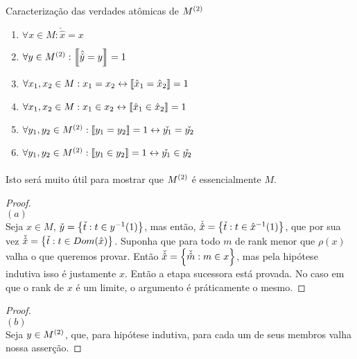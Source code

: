     \begin{theorem}{Caracterização das verdades atômicas de $M^{(2)}$}
        \begin{enumerate}[label=(\alph*)]
            \item $\forall x\in M   :\check{\hat{x}} = x$
            \item $\forall y\in M^{(2)}:\left\llbracket\hat{\check{y}} = y\right\rrbracket = 1$
            \item $\forall x_1, x_2 \in M   : x_1 =  x_2 \leftrightarrow \left\llbracket\hat x_1 = \hat x_2\right\rrbracket = 1$
            \item $\forall x_1, x_2 \in M   : x_1\in x_2 \leftrightarrow \left\llbracket\hat x_1 \in \hat x_2\right\rrbracket = 1$
            \item $\forall y_1, y_2 \in M^{(2)}:\left\llbracket y_1 = y_2\right\rrbracket=1\leftrightarrow\check{y_1} = \check{y_2}$
            \item $\forall y_1, y_2 \in M^{(2)}:\left\llbracket y_1 \in y_2\right\rrbracket=1\leftrightarrow\check{y_1}\in\check{y_2}$
        \end{enumerate}
        \paragraph{}
            Isto será muito útil para mostrar que $M^{(2)}$ é essencialmente $M$.
        \begin{proof}
            $ $\\$(a)$\\
            Seja $x\in M$,
            $\check{y} = \SET{\check{t} : t\in y^{-1}(1)}$, mas então, 
            $\check{\hat{x}} = \SET{\check{t} : t\in \hat{x}^{-1}(1)}$, que por sua vez
            $\check{\hat{x}} = \SET{\check{t} : t\in Dom(\hat{x})}$. Suponha que para 
            todo $m$ de rank menor que $\rho(x)$ valha o que queremos provar. Então 
            $\check{\hat{x}} = \SET{\check{\hat{m}} : m\in x}$, mas pela hipótese 
            indutiva isso é justamente $x$. Então a etapa sucessora está provada. No 
            caso em que o rank de $x$ é um limite, o argumento é práticamente o mesmo.
        \end{proof}
        \begin{proof}
            $ $\\$(b)$\\
            Seja $y\in M^{(2)}$, que, para hipótese indutiva, para cada um de seus membros 
            valha nossa asserção. 
        \end{proof}
    \end{theorem} 